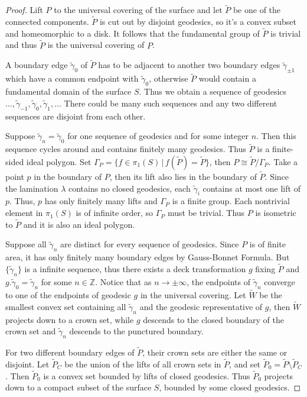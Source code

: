 \documentclass[reqno]{amsart}
\theoremstyle{plain}
\theoremstyle{definition}
\theoremstyle{remark}
\theoremstyle{definition}
\newcommand{\Z}{\mathbb Z}
\newcommand{\?}{\textcolor{red}{?}}
\begin{document}
\begin{proof}
Lift $P$ to the universal covering of the surface and let $\tilde{P}$ be one of the connected components. $\tilde{P}$ is cut out by disjoint geodesics, so it's a convex subset and homeomorphic to a disk. It follows that the fundamental group of $\tilde{P}$ is trivial and thus $\tilde{P}$ is the universal covering of $P$. 

A boundary edge $\tilde{\gamma}_0$ of $\tilde{P}$ has to be adjacent to another two boundary edges $\tilde{\gamma}_{\pm1}$ which have a common endpoint with $\tilde{\gamma}_0$, otherwise $\tilde{P}$ would contain a fundamental domain of the surface $S$. Thus we obtain a sequence of geodesics $\ldots, \tilde{\gamma}_{-1}, \tilde{\gamma}_{0}, \tilde{\gamma}_{1}, \ldots$ There could be many such sequences and any two different sequences are disjoint from each other.

Suppose $\tilde{\gamma}_n=\tilde{\gamma}_0$ for one sequence of geodesics and for some integer $n$. Then this sequence cycles around and contains finitely many geodesics. Thus $\tilde{P}$ is a finite-sided ideal polygon. Set $\Gamma_P = \{f\in \pi_1(S)\,|\, f(\tilde{P}) = \tilde{P}\}$, then $P \cong \tilde{P} / \Gamma_P$. Take a point $p$ in the boundary of $P$, then its lift also lies in the boundary of $\tilde{P}$. Since the lamination $\lambda$ contains no closed geodesics, each $\tilde{\gamma}_i$ contains at most one lift of $p$. Thus, $p$ has only finitely many lifts and $\Gamma_P$ is a finite group. Each nontrivial element in $\pi_1(S)$ is of infinite order, so $\Gamma_P$ must be trivial. Thus $P$ is isometric to $\tilde{P}$ and it is also an ideal polygon.

Suppose all $\tilde{\gamma}_n$ are distinct for every sequence of geodesics. Since $P$ is of finite area, it has only finitely many boundary edges by Gauss-Bonnet Formula. But $\{\tilde{\gamma}_n\}$ is a infinite sequence, thus there exists a deck transformation $g$ fixing $\tilde{P}$ and $g. \tilde{\gamma}_0 = \tilde{\gamma}_n$ for some $n\in\Z$. Notice that as $n\to\pm\infty$, the endpoints of $\tilde{\gamma}_n$ converge to one of the endpoints of geodesic $g$ in the universal covering. Let $\tilde{W}$ be the smallest convex set containing all $\tilde{\gamma}_n$ and the geodesic representative of $g$, then $\tilde{W}$ projects down to a crown set, while $g$ descends to the closed boundary of the crown set and $\tilde{\gamma}_n$ descends to the punctured boundary.

For two different boundary edges of $\tilde{P}$, their crown sets are either the same or disjoint. Let $\tilde{P}_C$ be the union of the lifts of all crown sets in $\tilde{P}$, and set $\tilde{P}_0 = \tilde{P}\setminus \tilde{P}_C$. Then $\tilde{P}_0$ is a convex set bounded by lifts of closed geodesics. Thus $\tilde{P}_0$ projects down to a compact subset of the surface $S$, bounded by some closed geodesics.
\end{proof}
\end{document}
